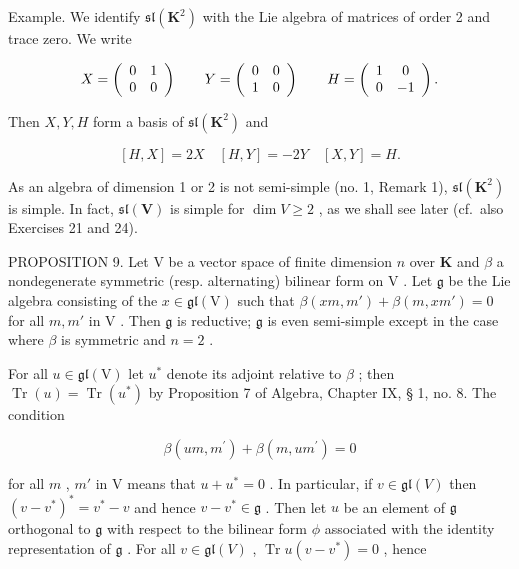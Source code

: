 Example. We identify \(\mathfrak{sl}(\mathbf{K}^{2})\) with the Lie algebra of matrices of order 2 and trace zero. We write

\[
X = \left( \begin{array}{c c} 0 & 1 \\ 0 & 0 \end{array} \right) \qquad Y = \left( \begin{array}{c c} 0 & 0 \\ 1 & 0 \end{array} \right) \qquad H = \left( \begin{array}{c c} 1 & 0 \\ 0 & - 1 \end{array} \right).
\]

Then \(X, Y, H\) form a basis of \(\mathfrak{sl}(\mathbf{K}^2)\) and

\[
[ H, X ] = 2 X \quad [ H, Y ] = - 2 Y \quad [ X, Y ] = H.
\]

As an algebra of dimension 1 or 2 is not semi-simple (no. 1, Remark 1), \(\mathfrak{sl}(\mathbf{K}^2)\) is simple. In fact, \(\mathfrak{sl}(\mathbf{V})\) is simple for \(\dim V \geqslant 2\) , as we shall see later (cf.~also Exercises 21 and 24).

PROPOSITION 9. Let \(\mathrm{V}\) be a vector space of finite dimension \(n\) over \(\mathbf{K}\) and \(\beta\) a nondegenerate symmetric (resp. alternating) bilinear form on \(\mathrm{V}\) . Let \(\mathfrak{g}\) be the Lie algebra consisting of the \(x \in \mathfrak{gl}(\mathrm{V})\) such that \(\beta (xm, m') + \beta (m, xm') = 0\) for all \(m, m'\) in \(\mathrm{V}\) . Then \(\mathfrak{g}\) is reductive; \(\mathfrak{g}\) is even semi-simple except in the case where \(\beta\) is symmetric and \(n = 2\) .

For all \(u \in \mathfrak{gl}(\mathrm{V})\) let \(u^*\) denote its adjoint relative to \(\beta\) ; then \(\operatorname{Tr}(u) = \operatorname{Tr}(u^*)\) by Proposition 7 of Algebra, Chapter IX, § 1, no. 8. The condition

\[
\beta (u m, m ^ {\prime}) + \beta (m, u m ^ {\prime}) = 0
\]

for all \(m\) , \(m'\) in V means that \(u + u^{*} = 0\) . In particular, if \(v \in \mathfrak{gl}(V)\) then \((v - v^{*})^{*} = v^{*} - v\) and hence \(v - v^{*} \in \mathfrak{g}\) . Then let \(u\) be an element of \(\mathfrak{g}\) orthogonal to \(\mathfrak{g}\) with respect to the bilinear form \(\phi\) associated with the identity representation of \(\mathfrak{g}\) . For all \(v \in \mathfrak{gl}(V)\) , \(\operatorname{Tr} u(v - v^{*}) = 0\) , hence

